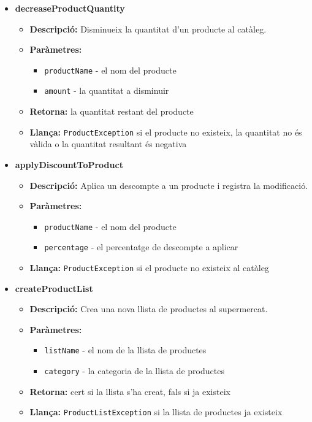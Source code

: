 \documentclass[a4paper, t]{article}
\begin{document}
\begin{itemize}
    \item \textbf{decreaseProductQuantity}
    \begin{itemize}
        \item \textbf{Descripció:} Disminueix la quantitat d'un producte al catàleg.
        \item \textbf{Paràmetres:}
        \begin{itemize}
            \item \texttt{productName} - el nom del producte
            \item \texttt{amount} - la quantitat a disminuir
        \end{itemize}
        \item \textbf{Retorna:} la quantitat restant del producte
        \item \textbf{Llança:} \texttt{ProductException} si el producte no existeix, la quantitat no és vàlida o la quantitat resultant és negativa
    \end{itemize}

    \item \textbf{applyDiscountToProduct}
    \begin{itemize}
        \item \textbf{Descripció:} Aplica un descompte a un producte i registra la modificació.
        \item \textbf{Paràmetres:}
        \begin{itemize}
            \item \texttt{productName} - el nom del producte
            \item \texttt{percentage} - el percentatge de descompte a aplicar
        \end{itemize}
        \item \textbf{Llança:} \texttt{ProductException} si el producte no existeix al catàleg
    \end{itemize}

    \item \textbf{createProductList}
    \begin{itemize}
        \item \textbf{Descripció:} Crea una nova llista de productes al supermercat.
        \item \textbf{Paràmetres:}
        \begin{itemize}
            \item \texttt{listName} - el nom de la llista de productes
            \item \texttt{category} - la categoria de la llista de productes
        \end{itemize}
        \item \textbf{Retorna:} cert si la llista s'ha creat, fals si ja existeix
        \item \textbf{Llança:} \texttt{ProductListException} si la llista de productes ja existeix
    \end{itemize}


\end{itemize}
\end{document}
